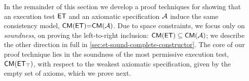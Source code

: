 In the remainder of this section we develop a proof techniques for showing  
that an execution test \(\mathsf{ET}\) and an axiomatic specification \(\mathcal{A}\) induce the same 
consistency model, \ie\(\CMs(\ET) {=} \CMs(\Ax)\). 
Due to space constraints, we focus only on \emph{soundness}, \ie on proving the left-to-right inclusion: \(\CMs(\ET) \subseteq \CMs(\Ax)\); 
we describe the other direction in full in \cref{sec:et-sound-complete-constructor}. 
The core of our proof technique lies in the soundness of the most permissive execution 
test, \(\CMs(\ET_{\top})\), with respect to the weakest axiomatic specification, given by 
the empty set of axioms, which we prove next.
%

%

